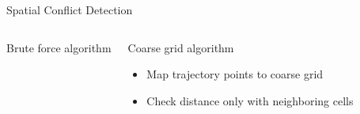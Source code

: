 \documentclass[10pt]{beamer}
\begin{document}
\begin{frame}[t]{Spatial Conflict Detection}
\begin{overprint}
\begin{columns}[t]
{\begin{block}{Brute force algorithm}
\begin{center}
                \end{center}
            \end{block}
        }
         {
            \begin{block}{Coarse grid algorithm}
                \begin{itemize}
                    \item Map trajectory points to coarse grid
                \end{itemize} 
                \begin{center}
                \end{center}
                 {
                \vspace{-0.3cm}
                \begin{itemize}
                    \item Check distance only with neighboring cells
                \end{itemize} 
                }
            \end{block}
        }
    \end{columns}
        
    \end{overprint}
\end{frame}
\end{document}
